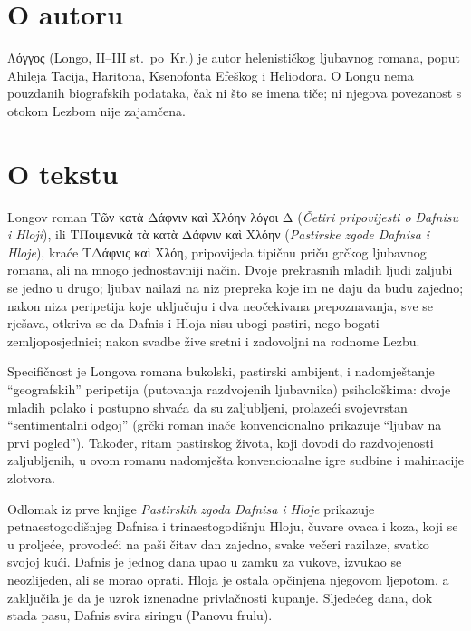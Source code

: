 \section*{O autoru}

Λόγγος (Longo, II–III st.\ po~Kr.) je autor helenističkog ljubavnog romana, poput Ahileja Tacija, Haritona, Ksenofonta Efeškog i Heliodora. O Longu nema pouzdanih biografskih podataka, čak ni što se imena tiče; ni njegova povezanost s otokom Lezbom nije zajamčena.

\section*{O tekstu}

Longov roman \textgreek{Τῶν κατὰ Δάφνιν καὶ Χλόην λόγοι Δ} (\textit{Četiri pripovijesti o Dafnisu i Hloji}), ili \textgreek{ΤΠοιμενικὰ τὰ κατὰ Δάφνιν καὶ Χλόην} (\textit{Pastirske zgode Dafnisa i Hloje}), kraće \textgreek{ΤΔάφνις καὶ Χλόη,} pripovijeda tipičnu priču grčkog ljubavnog romana, ali na mnogo jednostavniji način. Dvoje prekrasnih mladih ljudi zaljubi se jedno u drugo; ljubav nailazi na niz prepreka koje im ne daju da budu zajedno; nakon niza peripetija koje uključuju i dva neočekivana prepoznavanja, sve se rješava, otkriva se da Dafnis i Hloja nisu ubogi pastiri, nego bogati zemljoposjednici; nakon svadbe žive sretni i zadovoljni na rodnome Lezbu.

Specifičnost je Longova romana bukolski, pastirski ambijent, i nadomještanje ``geografskih'' peripetija (putovanja razdvojenih ljubavnika) psihološkima: dvoje mladih polako i postupno shvaća da su zaljubljeni, prolazeći svojevrstan ``sentimentalni odgoj'' (grčki roman inače konvencionalno prikazuje ``ljubav na prvi pogled''). Također, ritam pastirskog života, koji dovodi do razdvojenosti zaljubljenih, u ovom romanu nadomješta konvencionalne igre sudbine i mahinacije zlotvora.

Odlomak iz prve knjige \textit{Pastirskih zgoda Dafnisa i Hloje} prikazuje petnaestogodišnjeg Dafnisa i trinaestogodišnju Hloju, čuvare ovaca i koza, koji se u proljeće, provodeći na paši čitav dan zajedno, svake večeri razilaze, svatko svojoj kući. Dafnis je jednog dana upao u zamku za vukove, izvukao se neozlijeđen, ali se morao oprati. Hloja je ostala opčinjena njegovom ljepotom, a zaključila je da je uzrok iznenadne privlačnosti kupanje. Sljedećeg dana, dok stada pasu, Dafnis svira siringu (Panovu frulu).


